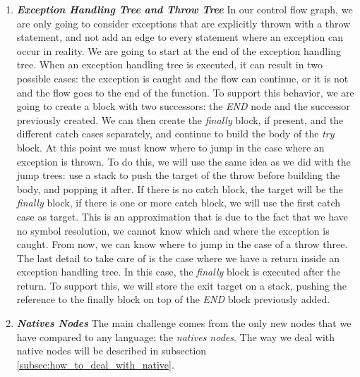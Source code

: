 \begin{enumerate}
	\item \textbf{\textit{Exception Handling Tree and Throw Tree}} \newline 
	\label{subsubsec:exception_handling_cfg}
	In our control flow graph, we are only going to consider exceptions that are explicitly thrown with a throw statement, and not add an edge to every statement where an exception can occur in reality. \newline
	We are going to start at the end of the exception handling tree. 
	When an exception handling tree is executed, it can result in two possible cases: the exception is caught and the flow can continue, or it is not and the flow goes to the end of the function. 
	To support this behavior, we are going to create a block with two successors: the \emph{END} node and the successor previously created. \newline
	We can then create the \emph{finally} block, if present, and the different catch cases separately, and continue to build the body of the \emph{try} block. 
	At this point we must know where to jump in the case where an exception is thrown. 
	To do this, we will use the same idea as we did with the jump trees: use a stack to push the target of the throw before building the body, and popping it after. 
	If there is no catch block, the target will be the \emph{finally} block, if there is one or more catch block, we will use the first catch case as target. 
	This is an approximation that is due to the fact that we have no symbol resolution, we cannot know which and where the exception is caught.
	From now, we can know where to jump in the case of a throw three.\newline
	The last detail to take care of is the case where we have a return inside an exception handling tree.
	In this case, the \emph{finally} block is executed after the return. 
	To support this, we will store the exit target on a stack, pushing the reference to the finally block on top of the \emph{END} block previously added.
	
	\item \textbf{\textit{Natives Nodes}} \newline 
	\label{subsubsec:native_nodes_cfg}
	The main challenge comes from the only new nodes that we have compared to any language: the \emph{natives nodes}. 
	The way we deal with native nodes will be described in subsection \ref{subsec:how_to_deal_with_native}.
\end{enumerate}

